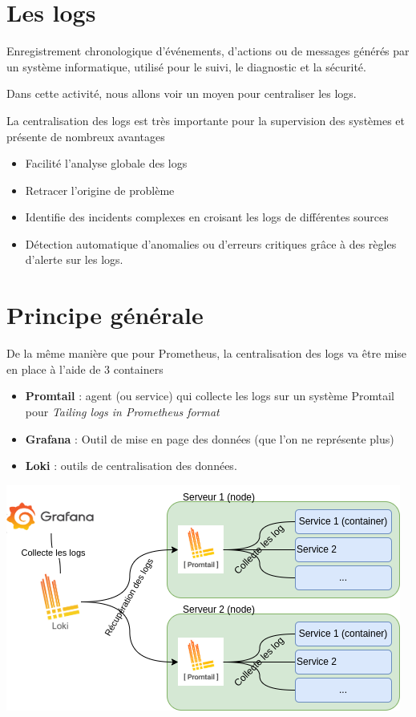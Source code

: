 \documentclass[french, 12pt]{article}%
\newcommand{\itemE}{\item[$\bullet$]}
\newcommand{\titreencadre}{Titre}
\newenvironment{encadre}[1]{\renewcommand{\titreencadre}{#1}
	\begin{mdframed}[style=encadrestyle]
	\vspace{0.5\baselineskip}
	}{%
	\end{mdframed}}
\begin{document}
\tableofcontents
\newpage


\section{Les logs}

\begin{encadre}{Log}
Enregistrement chronologique d'événements, d'actions ou de messages générés par un système informatique, utilisé pour le suivi, le diagnostic et la sécurité.
\end{encadre}

Dans cette activité, nous allons voir un moyen pour centraliser les logs. 


La centralisation des logs est très importante pour la supervision des systèmes  et présente de nombreux avantages 
\begin{itemize}
\itemE Facilité l'analyse globale des logs
\itemE Retracer l'origine de problème
\itemE Identifie des incidents complexes en croisant les logs de différentes sources 
\itemE Détection automatique d’anomalies ou d’erreurs critiques grâce à des règles d’alerte sur les logs.

\end{itemize}

\section{Principe générale}
De la même manière que pour Prometheus, la centralisation des logs va être mise en place à l'aide de 3 containers 
\begin{itemize}
\itemE \textbf{Promtail} : agent (ou service) qui collecte les logs sur un système Promtail pour \textit{Tailing logs in Prometheus format}
\itemE  \textbf{Grafana} : Outil de mise en page des données (que l'on ne représente plus)
\itemE  \textbf{Loki} : outils de centralisation des données.
\end{itemize}

\begin{center}
\includegraphics[scale=0.7]{./ressource/loki_Protmail.png}
\end{center}
\end{document}
